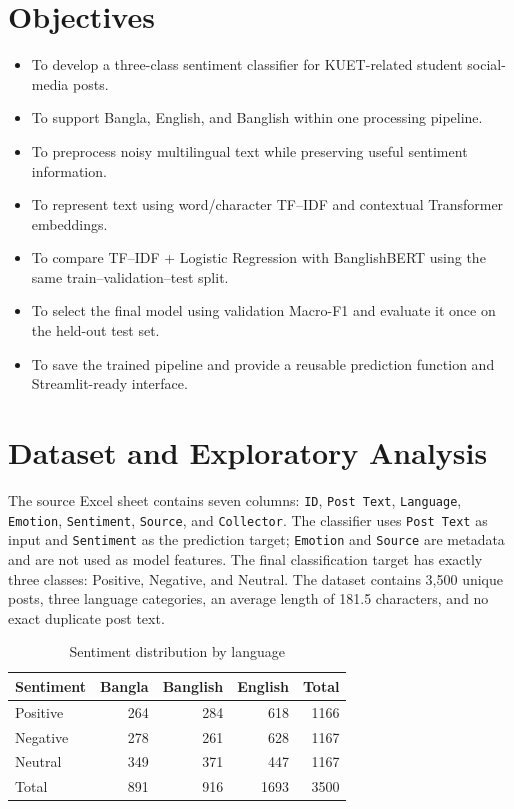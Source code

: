 \documentclass[12pt,a4paper]{report}
\begin{document}
\section{Objectives}
\begin{itemize}
    \item To develop a three-class sentiment classifier for KUET-related
    student social-media posts.
    \item To support Bangla, English, and Banglish within one processing
    pipeline.
    \item To preprocess noisy multilingual text while preserving useful
    sentiment information.
    \item To represent text using word/character TF--IDF and contextual
    Transformer embeddings.
    \item To compare TF--IDF + Logistic Regression with BanglishBERT using
    the same train--validation--test split.
    \item To select the final model using validation Macro-F1 and evaluate
    it once on the held-out test set.
    \item To save the trained pipeline and provide a reusable prediction
    function and Streamlit-ready interface.
\end{itemize}

\section{Dataset and Exploratory Analysis}
The source Excel sheet contains seven columns:
\texttt{ID}, \texttt{Post Text}, \texttt{Language}, \texttt{Emotion},
\texttt{Sentiment}, \texttt{Source}, and \texttt{Collector}. The classifier
uses \texttt{Post Text} as input and \texttt{Sentiment} as the prediction
target; \texttt{Emotion} and \texttt{Source} are metadata and are not used as
model features. The final classification target has exactly three classes:
Positive, Negative, and Neutral. The dataset contains 3,500 unique posts,
three language categories, an average length of 181.5 characters, and no
exact duplicate post text.

\begin{table}[H]
\centering
\caption{Sentiment distribution by language}
\small
\begin{tabular}{lrrrr}
\toprule
\textbf{Sentiment} & \textbf{Bangla} & \textbf{Banglish} &
\textbf{English} & \textbf{Total} \\
\midrule
Positive & 264 & 284 & 618 & 1166 \\
Negative & 278 & 261 & 628 & 1167 \\
Neutral  & 349 & 371 & 447 & 1167 \\
\midrule
Total & 891 & 916 & 1693 & 3500 \\
\bottomrule
\end{tabular}
\end{table}
\end{document}
